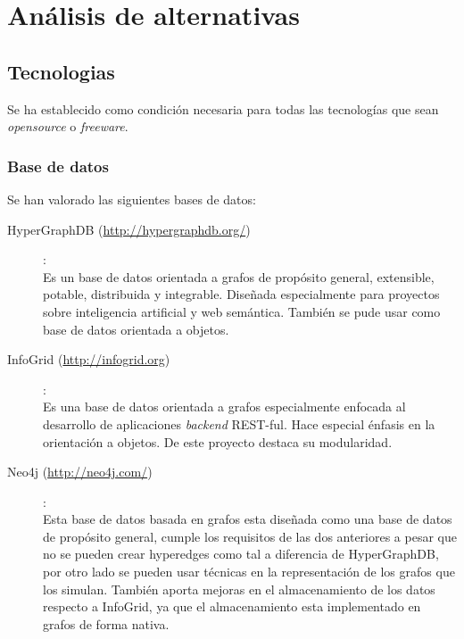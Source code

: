 \documentclass[12pt]{article} %
\begin{document}
\section{Análisis de alternativas}


\subsection{Tecnologias}
Se ha establecido como condición necesaria para todas las tecnologías que sean \textit{opensource} o \textit{freeware}. 

\subsubsection{Base de datos}
Se han valorado las siguientes bases de datos:

\begin{description}
\item[HyperGraphDB (\url{http://hypergraphdb.org/})]:
\\Es un base de datos orientada a grafos de propósito general, extensible, potable, distribuida y integrable. Diseñada especialmente para proyectos sobre inteligencia artificial y web semántica. También se pude usar como base de datos orientada a objetos.
\item[InfoGrid (\url{http://infogrid.org})]:
\\Es una base de datos orientada a grafos especialmente enfocada al desarrollo de aplicaciones \textit{backend} REST-ful. Hace especial énfasis en la orientación a objetos. De este proyecto destaca su modularidad. 
\item[Neo4j (\url{http://neo4j.com/})]:
\\Esta base de datos basada en grafos esta diseñada como una base de datos de propósito general, cumple los requisitos de las dos anteriores a pesar que no se pueden crear hyperedges como tal a diferencia de HyperGraphDB, por otro lado se pueden usar técnicas en la representación de los grafos que los simulan. También aporta mejoras en el almacenamiento de los datos respecto a InfoGrid, ya que el almacenamiento esta implementado en grafos de forma nativa.
\end{description}
\end{document}
